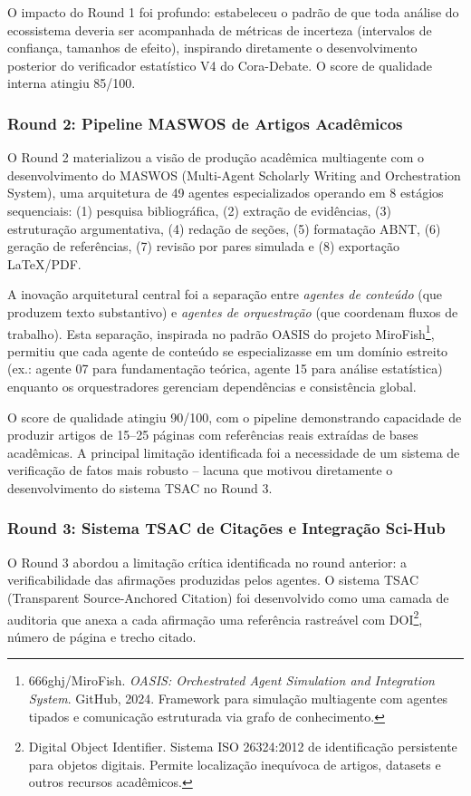 O impacto do Round 1 foi profundo: estabeleceu o padrão de que toda
análise do ecossistema deveria ser acompanhada de métricas de incerteza
(intervalos de confiança, tamanhos de efeito), inspirando diretamente o
desenvolvimento posterior do verificador estatístico V4 do Cora-Debate.
O score de qualidade interna atingiu 85/100.

\subsubsection{Round 2: Pipeline MASWOS de Artigos Acadêmicos}

O Round 2 materializou a visão de produção acadêmica multiagente com o
desenvolvimento do MASWOS (Multi-Agent Scholarly Writing and Orchestration
System), uma arquitetura de 49 agentes especializados operando em 8
estágios sequenciais: (1) pesquisa bibliográfica, (2) extração de
evidências, (3) estruturação argumentativa, (4) redação de seções, (5)
formatação ABNT, (6) geração de referências, (7) revisão por pares
simulada e (8) exportação LaTeX/PDF.

A inovação arquitetural central foi a separação entre \textit{agentes de
conteúdo} (que produzem texto substantivo) e \textit{agentes de
orquestração} (que coordenam fluxos de trabalho). Esta separação,
inspirada no padrão OASIS do projeto
MiroFish\footnote{666ghj/MiroFish. \textit{OASIS: Orchestrated Agent
Simulation and Integration System}. GitHub, 2024. Framework para simulação
multiagente com agentes tipados e comunicação estruturada via grafo de
conhecimento.}, permitiu que cada agente de conteúdo se especializasse em
um domínio estreito (ex.: agente 07 para fundamentação teórica, agente 15
para análise estatística) enquanto os orquestradores gerenciam
dependências e consistência global.

O score de qualidade atingiu 90/100, com o pipeline demonstrando
capacidade de produzir artigos de 15--25 páginas com referências reais
extraídas de bases acadêmicas. A principal limitação identificada foi a
necessidade de um sistema de verificação de fatos mais robusto -- lacuna
que motivou diretamente o desenvolvimento do sistema TSAC no Round 3.

\subsubsection{Round 3: Sistema TSAC de Citações e Integração Sci-Hub}

O Round 3 abordou a limitação crítica identificada no round anterior: a
verificabilidade das afirmações produzidas pelos agentes. O sistema TSAC
(Transparent Source-Anchored Citation) foi desenvolvido como uma camada de
auditoria que anexa a cada afirmação uma referência rastreável com
DOI\footnote{Digital Object Identifier. Sistema ISO 26324:2012 de
identificação persistente para objetos digitais. Permite localização
inequívoca de artigos, datasets e outros recursos acadêmicos.}, número de
página e trecho citado.


